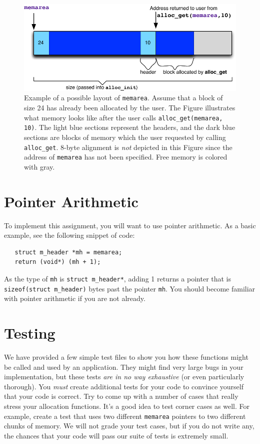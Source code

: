 \documentclass[12pt]{article}
\begin{document}
\begin{figure}
\centering
\includegraphics[width=0.7\linewidth]{simpleHeaderMP2}
\caption[Figure: Illustration of memory structure]{Example of a possible layout of \texttt{memarea}. Assume that a block of size 24 has already been allocated by the user. The Figure illustrates what memory looks like after the user calls \texttt{alloc\_get(memarea, 10)}. The light blue sections represent the headers, and the dark blue sections are blocks of memory which the user requested by calling  \texttt{alloc\_get}. 8-byte alignment is \emph{not} depicted in this Figure since the address of \texttt{memarea} has not been specified. Free memory is colored with gray.}
\label{fig:memorystructure}
\end{figure}

\section{Pointer Arithmetic}

To implement this assignment, you will want to use pointer arithmetic. As a basic example, see the following snippet of code:

\begin{verbatim}
   struct m_header *mh = memarea;
   return (void*) (mh + 1);
\end{verbatim}

As the type of \texttt{mh} is \texttt{struct m\_header*}, adding 1 returns a pointer that is \texttt{sizeof(struct m\_header)} bytes past the pointer \texttt{mh}. You should become familiar with pointer arithmetic if you are not already.

\section{Testing}
We have provided a few simple test files to show you how these functions might be called and used by an application. They might find very large bugs in your implementation, but these tests \emph{are in no way exhaustive} (or even particularly thorough). You \emph{must} create additional tests for your code to convince yourself that your code is correct. Try to come up with a number of cases that really stress your allocation functions. It's a good idea to test corner cases as well. For example, create a test that uses two different \texttt{memarea} pointers to two different chunks of memory. We will not grade your test cases, but if you do not write any, the chances that your code will pass our suite of tests is extremely small.
\end{document}
